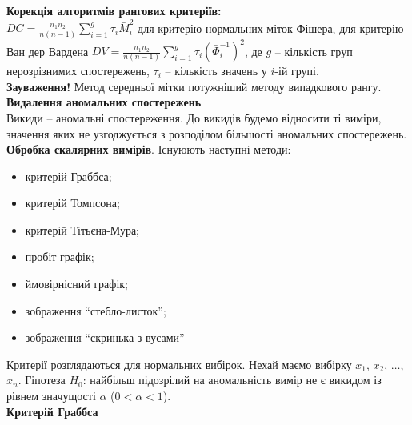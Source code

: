\textbf{Корекція алгоритмів рангових критеріїв:} \\

$DC = \frac{n_1 n_2}{n(n-1)} \sum_{i=1}^g \tau_i \bar{M}_i^2$ для критерію нормальних міток Фішера, для критерію Ван дер Вардена $DV = \frac{n_1 n_2}{n(n-1)} \sum_{i=1}^g \tau_i \left( \bar{\Phi}_i^{-1} \right)^2$, де $g$ -- кількість груп нерозрізнимих спостережень, $\tau_i$ -- кількість значень у $i$-ій групі. \\

\textbf{Зауваження!} Метод середньої мітки потужніший методу випадкового рангу. \\

\textbf{Видалення аномальних спостережень} \\

Викиди -- аномальні спостереження. До викидів будемо відносити ті виміри, значення яких не узгоджується  з розподілом більшості аномальних спостережень. \\

\textbf{Обробка скалярних вимірів}. Існуюють наступні методи:
\begin{itemize}
    \item критерій Граббса;
    
    \item критерій Томпсона;
    
    \item критерій Тітьєна-Мура;
    
    \item пробіт графік;
    
    \item ймовірнісний графік;
    
    \item зображення ``стебло-листок'';
    
    \item зображення ``скринька з вусами''
\end{itemize}

Критерії розглядаються для нормальних вибірок. Нехай маємо вибірку $x_1$, $x_2$, $\ldots$, $x_n$. Гіпотеза $H_0$: найбільш підозрілий на аномальність вимір не є викидом із рівнем значущості $\alpha$ ($0 < \alpha < 1$). \\

\textbf{Критерій Граббса} \\ 

